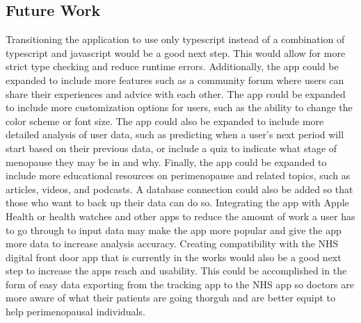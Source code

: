 \subsection{Future Work}
Transitioning the application to use only typescript instead of a combination of typescript and javascript would be a good next step. This would allow for more strict type checking and reduce runtime errors. Additionally, the app could be expanded to include more features such as a community forum where users can share their experiences and advice with each other. The app could be expanded to include more customization options for users, such as the ability to change the color scheme or font size. The app could also be expanded to include more detailed analysis of user data, such as predicting when a user's next period will start based on their previous data, or include a quiz to indicate what stage of menopause they may be in and why. Finally, the app could be expanded to include more educational resources on perimenopause and related topics, such as articles, videos, and podcasts. A database connection could also be added so that those who want to back up their data can do so. Integrating the app with Apple Health or health watches and other apps to reduce the amount of work a user has to go through to input data may make the app more popular and give the app more data to increase analysis accuracy. Creating compatibility with the NHS digital front door app that is currently in the works would also be a good next step to increase the apps reach and usability. This could be accomplished in the form of easy data exporting from the tracking app to the NHS app so doctors are more aware of what their patients are going thorguh and are better equipt to help perimenopausal individuals.